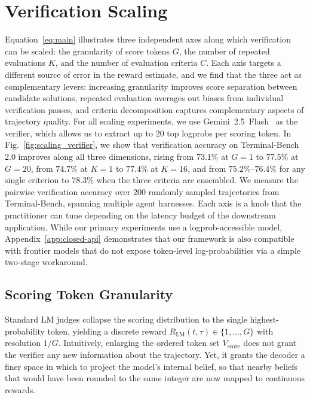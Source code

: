 \vspace{-1pt}
\section{Verification Scaling}
\label{sec:scaling}

Equation~\ref{eq:main} illustrates three independent axes along which verification can be scaled: the granularity of score tokens $G$, the number of repeated evaluations $K$, and the number of evaluation criteria $C$. Each axis targets a different source of error in the reward estimate, and we find that the three act as complementary levers: increasing granularity improves score separation between candidate solutions, repeated evaluation averages out biases from individual verification passes, and criteria decomposition captures complementary aspects of trajectory quality. For all scaling experiments, we use Gemini~2.5~Flash~\citep{gemini25flash} as the verifier, which allows us to extract up to 20 top logprobs per scoring token. In Fig.~\ref{fig:scaling_verifier}, we show that verification accuracy on Terminal-Bench 2.0 improves along all three dimensions, rising from $73.1\%$ at $G{=}1$ to $77.5\%$ at $G{=}20$, from $74.7\%$ at $K{=}1$ to $77.4\%$ at $K{=}16$, and from $75.2\%$--$76.4\%$ for any single criterion to $78.3\%$ when the three criteria are ensembled. We measure the pairwise verification accuracy over 200 randomly sampled trajectories from Terminal-Bench, spanning multiple agent harnesses. Each axis is a knob that the practitioner can tune depending on the latency budget of the downstream application. While our primary experiments use a logprob-accessible model, Appendix~\ref{app:closed-api} demonstrates that our framework is also compatible with frontier models that do not expose token-level log-probabilities via a simple two-stage workaround.

\subsection{Scoring Token Granularity}
\label{sec:granularity}

Standard LM judges collapse the scoring distribution to the single highest-probability token, yielding a discrete reward $R_{\text{LM}}(t,\tau)\in\{1,\ldots,G\}$ with resolution $1/G$. Intuitively, enlarging the ordered token set $V_{\text{score}}$ does not grant the verifier any new information about the trajectory. Yet, it grants the decoder a finer space in which to project the model's internal belief, so that nearby beliefs that would have been rounded to the same integer are now mapped to continuous rewards.

